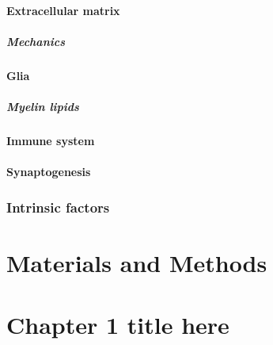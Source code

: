 \documentclass[
]{book}
\begin{document}
\hypertarget{extracellular-matrix}{%
\subsubsection{Extracellular matrix}\label{extracellular-matrix}}

\hypertarget{mechanics}{%
\paragraph{Mechanics}\label{mechanics}}

\hypertarget{glia}{%
\subsubsection{Glia}\label{glia}}

\hypertarget{myelin-lipids}{%
\paragraph{Myelin lipids}\label{myelin-lipids}}

\hypertarget{immune-system}{%
\subsubsection{Immune system}\label{immune-system}}

\hypertarget{synaptogenesis}{%
\subsubsection{Synaptogenesis}\label{synaptogenesis}}

\hypertarget{intrinsic-factors}{%
\subsection{Intrinsic factors}\label{intrinsic-factors}}

\hypertarget{METHODS}{%
\chapter*{Materials and Methods}\label{METHODS}}


\hypertarget{chapter-1-title-here}{%
\chapter{Chapter 1 title here}\label{chapter-1-title-here}}
\end{document}
